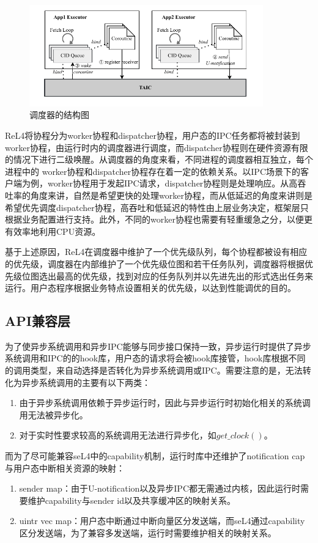 \begin{figure}[htbp]
  \centering
  \includegraphics[width=0.9\textwidth]{figures/TAIC.drawio.pdf}
  \caption{调度器的结构图}\label{fig:executor}
\end{figure}

ReL4将协程分为worker协程和dispatcher协程，用户态的IPC任务都将被封装到worker协程，由运行时内的调度器进行调度，而dispatcher协程则在硬件资源有限的情况下进行二级唤醒。从调度器的角度来看，不同进程的调度器相互独立，每个进程中的 worker协程和dispatcher协程存在着一定的依赖关系。以IPC场景下的客户端为例，worker协程用于发起IPC请求，dispatcher协程则是处理响应。从高吞吐率的角度来讲，自然是希望更快的处理worker协程，而从低延迟的角度来讲则是希望优先调度dispatcher协程，高吞吐和低延迟的特性由上层业务决定，框架层只根据业务配置进行支持。此外，不同的worker协程也需要有轻重缓急之分，以便更有效率地利用CPU资源。

基于上述原因，ReL4在调度器中维护了一个优先级队列，每个协程都被设有相应的优先级，调度器在内部维护了一个优先级位图和若干任务队列，调度器将根据优先级位图选出最高的优先级，找到对应的任务队列并以先进先出的形式选出任务来运行。用户态程序根据业务特点设置相关的优先级，以达到性能调优的目的。

\subsection{API兼容层}

为了使异步系统调用和异步IPC能够与同步接口保持一致，异步运行时提供了异步系统调用和IPC的的hook库，用户态的请求将会被hook库接管，hook库根据不同的调用类型，来自动选择是否转化为异步系统调用或IPC。需要注意的是，无法转化为异步系统调用的主要有以下两类：
\begin{enumerate}
  \item 由于异步系统调用依赖于异步运行时，因此与异步运行时初始化相关的系统调用无法被异步化。
  \item 对于实时性要求较高的系统调用无法进行异步化，如$get\_clock()$。
\end{enumerate}

而为了尽可能兼容seL4中的capability机制，运行时库中还维护了notification cap与用户态中断相关资源的映射：
\begin{enumerate}
  \item sender map：由于U-notification以及异步IPC都无需通过内核，因此运行时需要维护capability与sender id以及共享缓冲区的映射关系。
  \item uintr vec map：用户态中断通过中断向量区分发送端，而seL4通过capability区分发送端，为了兼容多发送端，运行时需要维护相关的映射关系。
\end{enumerate}

